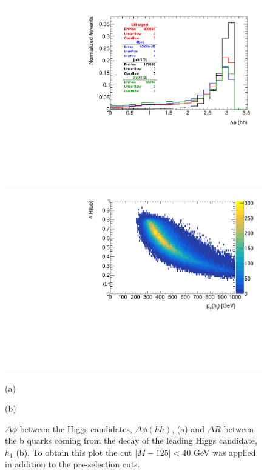 \begin{figure}
	\centering
	\begin{minipage}{.5\textwidth}
		\centering
		\includegraphics[width=\linewidth]{./Figures/hist_hh_deltaPhi.pdf}
	\end{minipage}%
	\begin{minipage}{.5\textwidth}
		\centering
		\includegraphics[width=\linewidth]{./Figures/hist_deltaR_bb_pt.pdf}
	\end{minipage}
	\begin{minipage}[t]{0.5\textwidth}
		\caption*{(a)}
	\end{minipage}%
	\hfill
	\begin{minipage}[t]{0.5\textwidth}
		\caption*{(b)}
	\end{minipage}
	\caption{$\Delta\phi$ between the Higgs candidates, $\Delta\phi(hh)$, (a) and $\Delta R$ between the b quarks coming from the decay of the leading Higgs candidate, $h_1$ (b). To obtain this plot the cut $|M-125|<40$ GeV was applied in addition to the pre-selection cuts.}
	\label{fig:deltaPhi_deltaR}
\end{figure}

